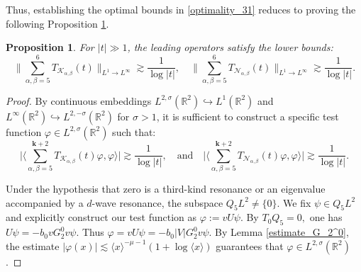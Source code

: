 \documentclass[reqno]{amsart}
\newtheorem{proposition}[theorem]{Proposition}
\numberwithin{equation}{section}
\begin{document}
Thus, establishing the optimal bounds in \eqref{optimality_31} reduces to proving the following Proposition \ref{sharp-3-4}.


\begin{proposition}\label{sharp-3-4}  
	For $|t| \gg 1$, the leading operators satisfy the lower bounds:  
\begin{equation}\label{low_bound_weighted_1}  
		\Big\|\sum_{\alpha,\beta = 5}^{6}T_{ \mathcal{K}_{\alpha,\beta}}(t)\Big\|_{L^1 \to L^\infty} \gtrsim \frac{1}{\log |t|}, \quad   
		\Big\|\sum_{\alpha,\beta = 5}^{6} T_{\mathcal{N}_{\alpha,\beta}}(t)\Big\|_{L^1 \to L^\infty} \gtrsim \frac{1}{\log |t|}.  
	\end{equation}  
\end{proposition}  

\begin{proof}
	 By continuous embeddings $L^{2,\sigma}(\mathbb{R}^2) \hookrightarrow L^1(\mathbb{R}^2)$ and $L^\infty(\mathbb{R}^2) \hookrightarrow L^{2,-\sigma}(\mathbb{R}^2)$ for $\sigma > 1$, it is  sufficient to construct a specific test function $\varphi \in L^{2,\sigma}(\mathbb{R}^2)$ such that:  
\begin{equation}\label{eq:lower_bounds}  
		\Big|\Big\langle \sum_{\alpha,\beta = 5}^{\mathbf{k}+2} T_{\mathcal{K}_{\alpha,\beta}}(t) \varphi, \varphi \Big\rangle \Big| \gtrsim \frac{1}{\log |t|}, \quad \text{and} \quad \Big|\Big\langle \sum_{\alpha,\beta = 5}^{\mathbf{k}+2} T_{\mathcal{N}_{\alpha,\beta}}(t) \varphi, \varphi \Big\rangle \Big| \gtrsim \frac{1}{\log |t|}. 
	\end{equation}  
	
	Under the hypothesis that zero is a third-kind resonance or an eigenvalue accompanied by a $d$-wave resonance, the subspace $Q_5 L^2\neq\{0\}$. We fix  $\psi \in Q_5 L^2$ and explicitly construct our test function as $\varphi := v U \psi $. By $T_0Q_5=0,$ one has $U\psi=-b_0vG_2^0v\psi.$ Thus $\varphi= v U \psi = -b_0 |V| G_2^0 v\psi.$ By Lemma \ref{estimate_G_2^0},
	 the estimate $|\varphi(x)| \lesssim \langle x \rangle^{-\mu-1}(1+\log\langle x\rangle)$ guarantees that $\varphi \in L^{2,\sigma}(\mathbb{R}^2)$.  
	 

\end{proof}
\end{document}
